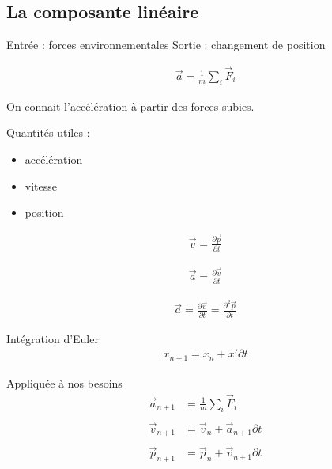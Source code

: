 \documentclass{beamer}
\newcommand{\deriv}{\partial \!}
\begin{document}
\subsection{La composante linéaire}

\begin{frame}
  Entrée : forces environnementales
  Sortie : changement de position

  \begin{align*}
    \vec{a} = \frac{1}{m} \sum_i \vec{F}_i
  \end{align*}

  On connait l'accélération à partir des forces subies.
\end{frame}

\begin{frame}
  Quantités utiles :
  \begin{itemize}
    \item accélération
    \item vitesse
    \item position
  \end{itemize}

  \begin{align*}
    \vec{v} = \frac{\deriv \vec{p}}{\deriv t}
  \end{align*}

  \begin{align*}
    \vec{a} = \frac{\deriv \vec{v}}{\deriv t}
  \end{align*}

  \begin{align*}
    \vec{a} = \frac{\deriv \vec{v}}{\deriv t} = \frac{\partial^2 \vec{p}}{\deriv t}
  \end{align*}
\end{frame}

\begin{frame}
  Intégration d'Euler
  \begin{align*}
    x_{n+1} = x_{n} + x' \deriv t
  \end{align*}

  Appliquée à nos besoins
  \begin{align*}
    \vec{a}_{n+1} &= \frac{1}{m} \sum_i \vec{F}_i \\ \\
    \vec{v}_{n+1} &= \vec{v}_n + \vec{a}_{n+1} \deriv t \\ \\
    \vec{p}_{n+1} &= \vec{p}_n + \vec{v}_{n+1} \deriv t
  \end{align*}

\end{frame}
\end{document}
